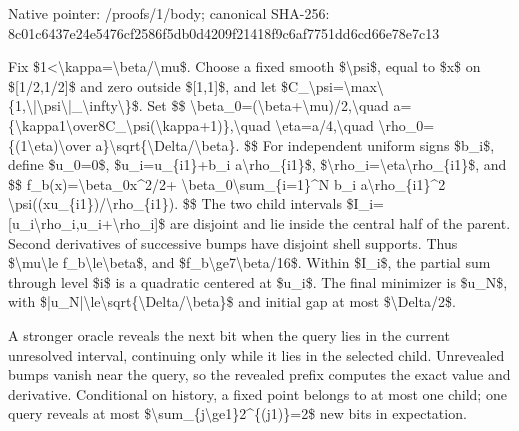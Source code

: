 \documentclass[10pt,a4paper]{article}
\begin{document}
Native pointer: /proofs/1/body; canonical SHA-256: 8c01c6437e24e5476cf2586f\allowbreak{}5db0d4209f21418f9c6af775\allowbreak{}1dd6cd66e78e7c13


Fix \$1<\textbackslash{}kappa=\textbackslash{}beta/\textbackslash{}mu\$. Choose a fixed smooth \$\textbackslash{}psi\$, equal to \$x\$ on \$[1/2,1/2]\$ and zero outside \$[1,1]\$, and let \$C\_\textbackslash{}psi=\textbackslash{}max\textbackslash{}\{1,\textbackslash{}|\textbackslash{}psi\textbackslash{}|\_\textbackslash{}infty\textbackslash{}\}\$. Set
\$\$
\textbackslash{}beta\_0=(\textbackslash{}beta+\textbackslash{}mu)/2,\textbackslash{}quad a=\{\textbackslash{}kappa1\textbackslash{}over8C\_\textbackslash{}psi(\allowbreak{}\textbackslash{}kappa+1)\},\textbackslash{}quad
\textbackslash{}eta=a/4,\textbackslash{}quad \textbackslash{}rho\_0=\{(1\textbackslash{}eta)\textbackslash{}over a\}\textbackslash{}sqrt\{\textbackslash{}Delta/\textbackslash{}beta\}.
\$\$
For independent uniform signs \$b\_i\$, define \$u\_0=0\$,
\$u\_i=u\_\{i1\}+b\_i a\textbackslash{}rho\_\{i1\}\$, \$\textbackslash{}rho\_i=\textbackslash{}eta\textbackslash{}rho\_\{i1\}\$, and
\$\$
f\_b(x)=\textbackslash{}beta\_0x\textasciicircum{}2/2+
\textbackslash{}beta\_0\textbackslash{}sum\_\{i=1\}\textasciicircum{}N b\_i a\textbackslash{}rho\_\{i1\}\textasciicircum{}2
\textbackslash{}psi((xu\_\{i1\})/\textbackslash{}rho\_\{i1\}).
\$\$
The two child intervals \$I\_i=[u\_i\textbackslash{}rho\_i,u\_i+\textbackslash{}rho\_i]\$ are disjoint and lie inside the central half of the parent. Second derivatives of successive bumps have disjoint shell supports. Thus \$\textbackslash{}mu\textbackslash{}le f\_b\textbackslash{}le\textbackslash{}beta\$, and \$f\_b\textbackslash{}ge7\textbackslash{}beta/16\$. Within \$I\_i\$, the partial sum through level \$i\$ is a quadratic centered at \$u\_i\$. The final minimizer is \$u\_N\$, with \$|u\_N|\textbackslash{}le\textbackslash{}sqrt\{\textbackslash{}Delta/\textbackslash{}beta\}\$ and initial gap at most \$\textbackslash{}Delta/2\$.

A stronger oracle reveals the next bit when the query lies in the current unresolved interval, continuing only while it lies in the selected child. Unrevealed bumps vanish near the query, so the revealed prefix computes the exact value and derivative. Conditional on history, a fixed point belongs to at most one child; one query reveals at most \$\textbackslash{}sum\_\{j\textbackslash{}ge1\}2\textasciicircum{}\{(j1)\}=2\$ new bits in expectation.
\end{document}
